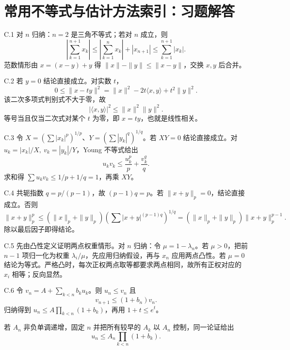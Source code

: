 \chapter{常用不等式与估计方法索引：习题解答}

\begin{solution}{C.1}
对 \(n\) 归纳：\(n=2\) 是三角不等式；若对 \(n\) 成立，则
\[
 \left|\sum_{k=1}^{n+1}x_k\right|
 \le\left|\sum_{k=1}^{n}x_k\right|+|x_{n+1}|
 \le\sum_{k=1}^{n+1}|x_k|.
\]
范数情形由 \(x=(x-y)+y\) 得 \(\|x\|-\|y\|\le\|x-y\|\)，交换 \(x,y\) 后合并。
\end{solution}

\begin{solution}{C.2}
若 \(y=0\) 结论直接成立。对实数 \(t\)，
\[
 0\le\|x-ty\|^2=\|x\|^2-2t\langle x,y\rangle+t^2\|y\|^2.
\]
该二次多项式判别式不大于零，故
\[
 |\langle x,y\rangle|^2\le\|x\|^2\|y\|^2.
\]
等号当且仅当二次式对某个 \(t\) 为零，即 \(x=ty\)，也就是线性相关。
\end{solution}

\begin{solution}{C.3}
令 \(X=(\sum|x_k|^p)^{1/p}\)、\(Y=(\sum|y_k|^q)^{1/q}\)。若 \(XY=0\) 结论直接成立。对 \(u_k=|x_k|/X,\ v_k=|y_k|/Y\)，Young 不等式给出
\[
 u_kv_k\le\frac{u_k^p}{p}+\frac{v_k^q}{q}.
\]
求和得 \(\sum u_kv_k\le1/p+1/q=1\)，再乘 \(XY\)。
\end{solution}

\begin{solution}{C.4}
共轭指数 \(q=p/(p-1)\)，故 \((p-1)q=p\)。若 \(\|x+y\|_p=0\)，结论直接成立。否则
\[
 \|x+y\|_p^p
 \le(\|x\|_p+\|y\|_p)
 \left(\sum|x+y|^{(p-1)q}\right)^{1/q}
 =(\|x\|_p+\|y\|_p)\|x+y\|_p^{p-1}.
\]
除以最后因子即得结论。
\end{solution}

\begin{solution}{C.5}
先由凸性定义证明两点权重情形。对 \(n\) 归纳：令 \(\mu=1-\lambda_n\)。若 \(\mu>0\)，把前 \(n-1\) 项归一化为权重 \(\lambda_i/\mu\)，先应用归纳假设，再与 \(x_n\) 应用两点凸性。若 \(\mu=0\) 结论为等式。严格凸时，每次正权两点取等都要求两点相同，故所有正权对应的 \(x_i\) 相等；反向显然。
\end{solution}

\begin{solution}{C.6}
令 \(v_n=A+\sum_{k<n}b_ku_k\)。则 \(u_n\le v_n\) 且
\[
 v_{n+1}\le(1+b_n)v_n.
\]
归纳得到 \(u_n\le A\prod_{k<n}(1+b_k)\)，再用 \(1+t\le e^t\)。

若 \(A_n\) 非负单调递增，固定 \(n\) 并把所有较早的 \(A_k\) 以 \(A_n\) 控制，同一论证给出
\[
 u_n\le A_n\prod_{k<n}(1+b_k).
\]
\end{solution}

